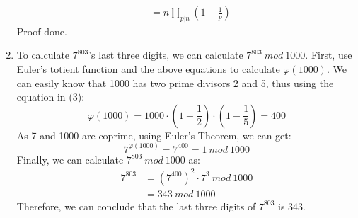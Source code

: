 \documentclass[12pt, a4paper]{article}
\begin{document}
\begin{enumerate}
\begin{align*}
                         &= n \prod_{p|n}(1 - \frac{1}{p})
          \end{align*}
          Proof done.
    \item To calculate $7^{803}$'s last three digits, we can calculate $7^{803}\ mod\ 1000$.\newline
          First, use Euler's totient function and the above equations to calculate $\varphi(1000)$. 
          We can easily know that 1000 has two prime divisors 2 and 5, thus using the equation in (3):
          $$\varphi(1000) = 1000\cdot (1 - \frac{1}{2})\cdot (1 - \frac{1}{5}) = 400$$
          As 7 and 1000 are coprime, using Euler's Theorem, we can get:
          $$7^{\varphi(1000)} = 7^{400} = 1\ mod\ 1000$$
          Finally, we can calculate $7^{803}\ mod\ 1000$ as:
          \begin{align*}
              7^{803} &= (7^{400})^2\cdot 7^3\ mod\ 1000\\
                      &= 343\ mod\ 1000
          \end{align*}
          Therefore, we can conclude that the last three digits of $7^{803}$ is 343.
          
\end{enumerate}
\end{document}
